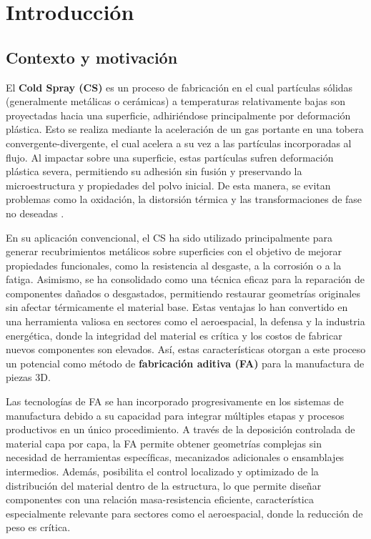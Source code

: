 \chapter{Introducción}

\section{Contexto y motivación}

El \textbf{Cold Spray (CS)} es un proceso de fabricación en el cual partículas sólidas (generalmente metálicas o cerámicas) a temperaturas relativamente bajas son proyectadas hacia una superficie, adhiriéndose principalmente por deformación plástica\cite{Papyrin2007}. Esto se realiza mediante la aceleración de un gas portante en una tobera convergente-divergente, el cual acelera a su vez a las partículas incorporadas al flujo. Al impactar sobre una superficie, estas partículas sufren deformación plástica severa, permitiendo su adhesión sin fusión y preservando la microestructura y propiedades del polvo inicial. De esta manera, se evitan problemas como la oxidación, la distorsión térmica y las transformaciones de fase no deseadas \cite{Assadi2003}.

En su aplicación convencional, el CS ha sido utilizado principalmente para generar recubrimientos metálicos sobre superficies con el objetivo de mejorar propiedades funcionales, como la resistencia al desgaste, a la corrosión o a la fatiga\cite{Champagne2016unique}. Asimismo, se ha consolidado como una técnica eficaz para la reparación de componentes dañados o desgastados, permitiendo restaurar geometrías originales sin afectar térmicamente el material base. Estas ventajas lo han convertido en una herramienta valiosa en sectores como el aeroespacial, la defensa y la industria energética, donde la integridad del material es crítica y los costos de fabricar nuevos componentes son elevados\cite{Champagne2015repairs}. Así, estas características otorgan a este proceso un potencial como método de \textbf{fabricación aditiva (FA)} para la manufactura de piezas 3D.

Las tecnologías de FA se han incorporado progresivamente en los sistemas de manufactura debido a su capacidad para integrar múltiples etapas y procesos productivos en un único procedimiento. A través de la deposición controlada de material capa por capa, la FA permite obtener geometrías complejas sin necesidad de herramientas específicas, mecanizados adicionales o ensamblajes intermedios. Además, posibilita el control localizado y optimizado de la distribución del material dentro de la estructura, lo que permite diseñar componentes con una relación masa-resistencia eficiente, característica especialmente relevante para sectores como el aeroespacial, donde la reducción de peso es crítica\cite{Gibson2015}.

